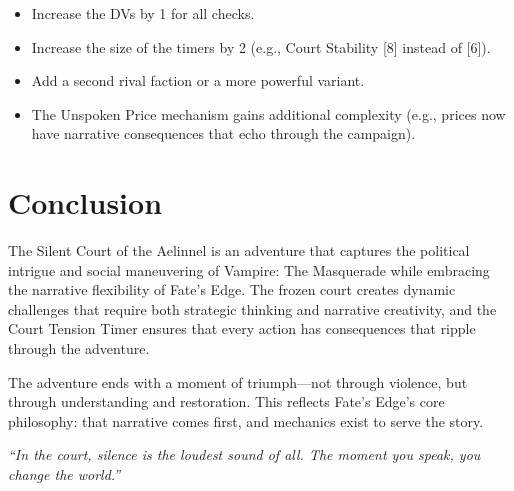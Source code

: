 \documentclass{article}
\begin{document}
\begin{itemize}
    \item Increase the DVs by 1 for all checks.
    \item Increase the size of the timers by 2 (e.g., Court Stability [8] instead of [6]).
    \item Add a second rival faction or a more powerful variant.
    \item The Unspoken Price mechanism gains additional complexity (e.g., prices now have narrative consequences that echo through the campaign).
\end{itemize}

\section{Conclusion}

The Silent Court of the Aelinnel is an adventure that captures the political intrigue and social maneuvering of Vampire: The Masquerade while embracing the narrative flexibility of Fate's Edge. The frozen court creates dynamic challenges that require both strategic thinking and narrative creativity, and the Court Tension Timer ensures that every action has consequences that ripple through the adventure.

The adventure ends with a moment of triumph---not through violence, but through understanding and restoration. This reflects Fate's Edge's core philosophy: that narrative comes first, and mechanics exist to serve the story.

\begin{center}
\textit{``In the court, silence is the loudest sound of all. The moment you speak, you change the world.''}
\end{center}
\end{document}
